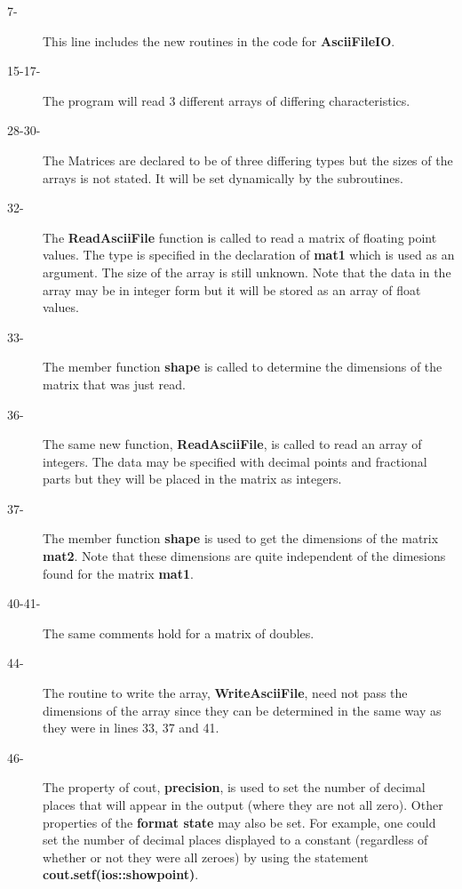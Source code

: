 \begin{description}
\item[7-] This line includes the new routines in the code for {\bf AsciiFileIO}.

\item[15-17-] The program will read 3 different arrays of differing characteristics.

\item[28-30-] The Matrices are declared to be of three differing types but the sizes
of the arrays is not stated.  It will be set dynamically by the subroutines.

\item[32-] The {\bf ReadAsciiFile} function is called to read a matrix of
floating point values.
The type is specified in the declaration of {\bf mat1} which is used as an
argument. The size of the array is still unknown.  Note that the data in the
array may be in integer form but it will be stored as an array of float
values.

\item[33-] The member function {\bf shape} is called to determine the dimensions of
the matrix that was just read.

\item[36-] The same new function, {\bf ReadAsciiFile},  is called to read an array of
integers. The data
may be specified with decimal points and fractional parts but they will be
placed in the matrix as integers.

\item[37-] The member function {\bf shape} is used to get the dimensions of the
matrix {\bf mat2}. Note that these dimensions are quite independent of the
dimesions found for the matrix {\bf mat1}.

\item[40-41-] The same comments hold for a matrix of doubles.

\item[44-] The routine to write the array, {\bf WriteAsciiFile},  need not pass
the dimensions of the array since they can be determined in the same way
as they were in lines 33, 37 and 41. 

\item[46-] The property of cout, {\bf precision}, is used to set the number of decimal
places that will appear in the output (where they are not all zero).  Other
properties of the {\bf format state} may also be set.  For example, one could
set the number of decimal places displayed to a constant (regardless of whether
or not they were all zeroes) by using the statement 
{\bf cout.setf(ios::showpoint)}. 
\end{description}


